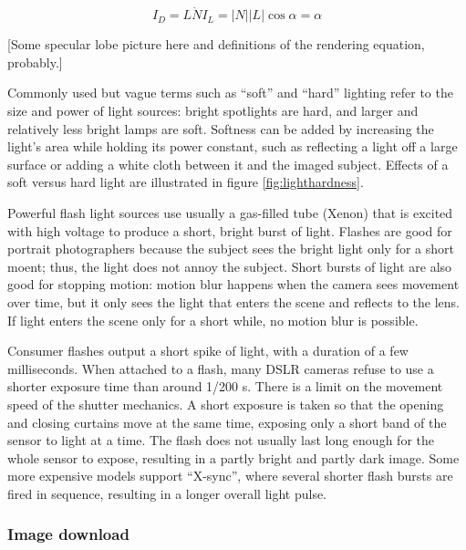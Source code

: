 \begin{equation} \label{eq:lambertcosine}
	I_D = L \dot N I_L = |N| |L| \cos \alpha = \alpha
\end{equation}

[Some specular lobe picture here and definitions of the rendering equation, probably.]

Commonly used but vague terms such as ``soft'' and ``hard'' lighting refer to the size and power of light sources: bright spotlights are hard, and larger and relatively less bright lamps are soft.
Softness can be added by increasing the light's area while holding its power constant, such as reflecting a light off a large surface or adding a white cloth between it and the imaged subject.
Effects of a soft versus hard light are illustrated in figure \ref{fig:lighthardness}.

Powerful flash light sources use usually a gas-filled tube (Xenon) that is excited with high voltage to produce a short, bright burst of light.
Flashes are good for portrait photographers because the subject sees the bright light only for a short moent; thus, the light does not annoy the subject.
Short bursts of light are also good for stopping motion: motion blur happens when the camera sees movement over time, but it only sees the light that enters the scene and reflects to the lens.
If light enters the scene only for a short while, no motion blur is possible.

Consumer flashes output a short spike of light, with a duration of a few milliseconds.
When attached to a flash, many DSLR cameras refuse to use a shorter exposure time than around 1/200 s.
There is a limit on the movement speed of the shutter mechanics.
A short exposure is taken so that the opening and closing curtains move at the same time, exposing only a short band of the sensor to light at a time.
The flash does not usually last long enough for the whole sensor to expose, resulting in a partly bright and partly dark image.
Some more expensive models support ``X-sync'', where several shorter flash bursts are fired in sequence, resulting in a longer overall light pulse.






\subsubsection{Image download} %

